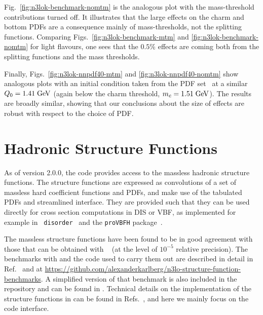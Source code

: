 Fig.~\ref{fig:n3lok-benchmark-nomtm} is the analogous plot with the
\ntlo mass-threshold contributions turned off.
%
It illustrates that the large effects on the charm and bottom PDFs are
a consequence mainly of \ntlo mass-thresholds, not the \ntlo splitting functions.
%
Comparing Figs.~\ref{fig:n3lok-benchmark-mtm} and
\ref{fig:n3lok-benchmark-nomtm} for light flavours, one sees that the $0.5\%$
effects are coming both from the \ntlo splitting functions and the
\ntlo mass thresholds.

Finally, Figs.~\ref{fig:n3lok-nnpdf40-mtm} and
\ref{fig:n3lok-nnpdf40-nomtm} show analogous plots with an initial
condition taken from the  PDF
set~\cite{NNPDF:2021njg} at a similar $Q_0 = 1.41 \;\mathrm{GeV}$ (again below
the charm threshold, $m_c = 1.51\;\mathrm{GeV}$).
%
The results are broadly similar, showing that our conclusions about the
size of \ntlo effects are robust with respect to the choice of PDF.



\section{Hadronic Structure Functions}
\label{sec:structure-funcs}
As of \hoppet version 2.0.0, the code provides access to the massless
hadronic structure functions. The structure functions are expressed as
convolutions of a set of massless hard coefficient functions and PDFs,
and make use of the tabulated PDFs and streamlined interface.  They
are provided such that they can be used directly for cross section
computations in DIS or VBF, as implemented for example in {\tt
  disorder}~\cite{Karlberg:2024hnl} and the {\tt proVBFH}
package~\cite{Cacciari:2015jma,Dreyer:2016oyx,Dreyer:2018qbw,Dreyer:2018rfu,Dreyer:2020urf,Dreyer:2020xaj}.

The massless structure functions have been found to be in good
agreement with those that can be obtained with
\APFELPP{}~\cite{Bertone:2013vaa,Bertone:2017gds} (at the level of
$10^{-5}$ relative precision).
%
The benchmarks with \APFELPP{} and the code used to carry them out are
described in detail in Ref.~\cite{Bertone:2024dpm} and at
\url{https://github.com/alexanderkarlberg/n3lo-structure-function-benchmarks}. A
simplified version of that benchmark is also included in the \hoppet
repository and can be found in
.
%
Technical details on the implementation of the structure functions in
\hoppet can be found in
Refs.~\cite{Dreyer:2016vbc,Karlberg:2016zik,Bertone:2024dpm}, and here
we mainly focus on the code interface.

